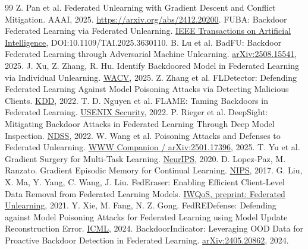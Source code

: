 \documentclass[10pt,a4paper]{article}
\begin{document}
\begin{thebibliography}{99}
 Z. Pan et al. Federated Unlearning with Gradient Descent and Conflict Mitigation.
AAAI, 2025. \url{https://arxiv.org/abs/2412.20200}.
 FUBA: Backdoor Federated Learning via Federated Unlearning.
\href{https://ieeexplore.ieee.org/document/11231135/}{IEEE Transactions on Artificial Intelligence}, DOI:10.1109/TAI.2025.3630110.
 B. Lu et al. BadFU: Backdoor Federated Learning through Adversarial Machine Unlearning.
\href{https://arxiv.org/abs/2508.15541}{arXiv:2508.15541}, 2025.
 J. Xu, Z. Zhang, R. Hu. Identify Backdoored Model in Federated Learning via Individual Unlearning.
\href{https://arxiv.org/abs/2411.01040}{WACV}, 2025.
 Z. Zhang et al. FLDetector: Defending Federated Learning Against Model Poisoning Attacks via Detecting Malicious Clients.
\href{https://zaixizhang.github.io/ZaixiZhang_files/FLDetector.pdf}{KDD}, 2022.
 T. D. Nguyen et al. FLAME: Taming Backdoors in Federated Learning.
\href{https://www.usenix.org/system/files/sec22-nguyen.pdf}{USENIX Security}, 2022.
 P. Rieger et al. DeepSight: Mitigating Backdoor Attacks in Federated Learning Through Deep Model Inspection.
\href{https://www.ndss-symposium.org/wp-content/uploads/2022-156-paper.pdf}{NDSS}, 2022.
 W. Wang et al. Poisoning Attacks and Defenses to Federated Unlearning.
\href{https://arxiv.org/abs/2501.17396}{WWW Companion / arXiv:2501.17396}, 2025.
 T. Yu et al. Gradient Surgery for Multi-Task Learning.
\href{https://arxiv.org/abs/2001.06782}{NeurIPS}, 2020.
 D. Lopez-Paz, M. Ranzato. Gradient Episodic Memory for Continual Learning.
\href{https://papers.nips.cc/paper/2017/hash/f87522788a2be2d171666752f97ddebb-Abstract.html}{NIPS}, 2017.
 G. Liu, X. Ma, Y. Yang, C. Wang, J. Liu.
FedEraser: Enabling Efficient Client-Level Data Removal from Federated Learning Models.
\href{https://arxiv.org/abs/2012.13891}{IWQoS, preprint: Federated Unlearning}, 2021.
 Y. Xie, M. Fang, N. Z. Gong.
FedREDefense: Defending against Model Poisoning Attacks for Federated Learning using Model Update Reconstruction Error.
\href{https://proceedings.mlr.press/v235/xie24c.html}{ICML}, 2024.
 BackdoorIndicator: Leveraging OOD Data for Proactive Backdoor Detection in Federated Learning.
\href{https://arxiv.org/abs/2405.20862}{arXiv:2405.20862}, 2024.
\end{thebibliography}
\end{document}
